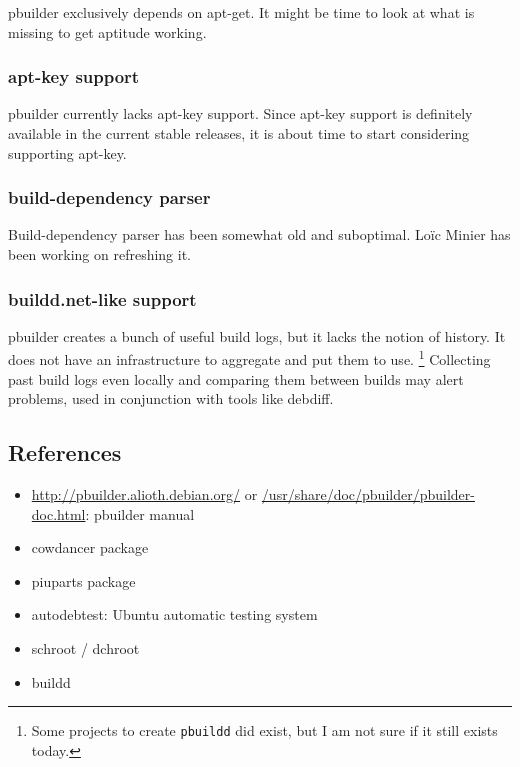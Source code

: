 \documentclass[a4paper]{article}
\begin{document}
pbuilder exclusively depends on apt-get.  It might be time to look at
what is missing to get aptitude working.

\subsubsection{apt-key support}

pbuilder currently lacks apt-key support.  Since apt-key support is
definitely available in the current stable releases, it is about time to
start considering supporting apt-key.

\subsubsection{build-dependency parser}

Build-dependency parser has been somewhat old and suboptimal.  Lo\"ic
Minier has been working on refreshing it.

\subsubsection{buildd.net-like support}

pbuilder creates a bunch of useful build logs, but it lacks the notion
of history. It does not have an infrastructure to aggregate and put them
to use.  \footnote{Some projects to create \texttt{pbuildd} did exist,
but I am not sure if it still exists today.  } Collecting past build
logs even locally and comparing them between builds may alert problems,
used in conjunction with tools like debdiff.

\subsection{References}

\begin{itemize}
 \item \url{http://pbuilder.alioth.debian.org/} or
 \url{/usr/share/doc/pbuilder/pbuilder-doc.html}: pbuilder manual
 \item cowdancer package
 \item piuparts package
 \item autodebtest: Ubuntu automatic testing system
 \item schroot / dchroot 
 \item buildd
\end{itemize}
\end{document}
